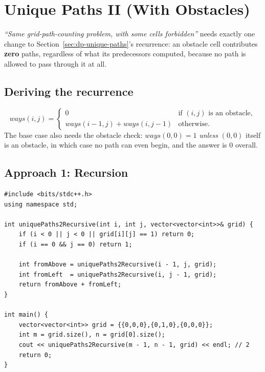 \section{Unique Paths II (With Obstacles)}
\label{sec:dp-unique-paths-2}


\begin{patternbox}
\emph{``Same grid-path-counting problem, with some cells forbidden''}
needs exactly one change to Section~\ref{sec:dp-unique-paths}'s
recurrence: an obstacle cell contributes \textbf{zero} paths, regardless
of what its predecessors computed, because no path is allowed to pass
through it at all.
\end{patternbox}

\subsection*{Deriving the recurrence}

\[
  \textit{ways}(i,j) =
  \begin{cases}
    0 & \text{if } (i,j) \text{ is an obstacle}, \\
    \textit{ways}(i-1,j) + \textit{ways}(i,j-1) & \text{otherwise.}
  \end{cases}
\]
The base case also needs the obstacle check: $\textit{ways}(0,0) = 1$
\emph{unless} $(0,0)$ itself is an obstacle, in which case no path can
even begin, and the answer is $0$ overall.

\subsection*{Approach 1: Recursion}

\begin{lstlisting}
#include <bits/stdc++.h>
using namespace std;

int uniquePaths2Recursive(int i, int j, vector<vector<int>>& grid) {
    if (i < 0 || j < 0 || grid[i][j] == 1) return 0;
    if (i == 0 && j == 0) return 1;

    int fromAbove = uniquePaths2Recursive(i - 1, j, grid);
    int fromLeft  = uniquePaths2Recursive(i, j - 1, grid);
    return fromAbove + fromLeft;
}

int main() {
    vector<vector<int>> grid = {{0,0,0},{0,1,0},{0,0,0}};
    int m = grid.size(), n = grid[0].size();
    cout << uniquePaths2Recursive(m - 1, n - 1, grid) << endl; // 2
    return 0;
}
\end{lstlisting}

